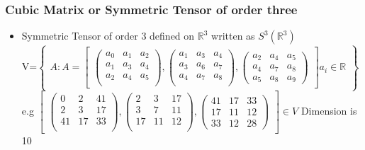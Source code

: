 \documentclass{beamer}
\begin{document}
\begin{frame}
\frametitle{Cubic Matrix or Symmetric Tensor of order three}
\begin{block}{}
\begin{itemize}
\item Symmetric Tensor of order 3 defined on $\mathbb{R}^3$ written as $S^3(\mathbb{R}^3)$\\

\newcommand\fontsizeXi{\fontsize{11pt}{9pt}\selectfont}
{\fontsizeXi
V=$\begin{Bmatrix} 
  A: A=
\begin{bmatrix}
\begin{pmatrix}a_0& a_1& a_2\\
a_1& a_3& a_4\\
a_2& a_4& a_5\\
\end{pmatrix},

\begin{pmatrix}
a_1& a_3& a_4\\
a_3& a_6& a_7\\
a_4& a_7& a_8\\
\end{pmatrix},

\begin{pmatrix}
a_2& a_4& a_5\\
a_4& a_7& a_8\\
a_5& a_8& a_9
\end{pmatrix}
\end{bmatrix} a_i \in \mathbb{R}
\end{Bmatrix}$}\\

e.g {\fontsizeXi$\begin{bmatrix}
\begin{pmatrix}0& 2& 41\\
2& 3& 17\\
41& 17& 33\\
\end{pmatrix},

\begin{pmatrix}
2& 3& 17\\
3& 7& 11\\
17& 11& 12\\
\end{pmatrix},

\begin{pmatrix}
41& 17& 33\\
17& 11& 12\\
33& 12& 28
\end{pmatrix}
\end{bmatrix}
\in V$}
Dimension is 10
\end{itemize}
\end{block}

\end{frame}
\end{document}
